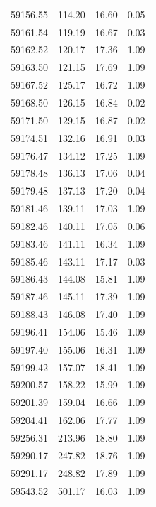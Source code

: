 \begin{longtable}{|c|c|c|c|}
 59156.55 &  114.20 &       16.60 &          0.05 \\
 59161.54 &  119.19 &       16.67 &          0.03 \\
 59162.52 &  120.17 &       17.36 &          1.09 \\
 59163.50 &  121.15 &       17.69 &          1.09 \\
 59167.52 &  125.17 &       16.72 &          1.09 \\
 59168.50 &  126.15 &       16.84 &          0.02 \\
 59171.50 &  129.15 &       16.87 &          0.02 \\
 59174.51 &  132.16 &       16.91 &          0.03 \\
 59176.47 &  134.12 &       17.25 &          1.09 \\
 59178.48 &  136.13 &       17.06 &          0.04 \\
 59179.48 &  137.13 &       17.20 &          0.04 \\
 59181.46 &  139.11 &       17.03 &          1.09 \\
 59182.46 &  140.11 &       17.05 &          0.06 \\
 59183.46 &  141.11 &       16.34 &          1.09 \\
 59185.46 &  143.11 &       17.17 &          0.03 \\
 59186.43 &  144.08 &       15.81 &          1.09 \\
 59187.46 &  145.11 &       17.39 &          1.09 \\
 59188.43 &  146.08 &       17.40 &          1.09 \\
 59196.41 &  154.06 &       15.46 &          1.09 \\
 59197.40 &  155.06 &       16.31 &          1.09 \\
 59199.42 &  157.07 &       18.41 &          1.09 \\
 59200.57 &  158.22 &       15.99 &          1.09 \\
 59201.39 &  159.04 &       16.66 &          1.09 \\
 59204.41 &  162.06 &       17.77 &          1.09 \\
 59256.31 &  213.96 &       18.80 &          1.09 \\
 59290.17 &  247.82 &       18.76 &          1.09 \\
 59291.17 &  248.82 &       17.89 &          1.09 \\
 59543.52 &  501.17 &       16.03 &          1.09 \\

\end{longtable}
